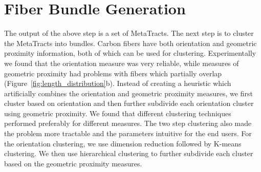 \section {Fiber Bundle Generation}
\label{subsec:fiber-bundles}

The output of the above step is a set of MetaTracts. The next step is to cluster the MetaTracts into bundles. 
Carbon fibers have both orientation and geometric proximity information, both of which can be used for clustering. Experimentally we found that the orientation measure was very reliable, while measures of geometric proximity had problems with fibers which partially overlap (Figure~\ref{fig:length_distribution}b).  
Instead of creating a heuristic which artificially combines the orientation and geometric proximity measures, we first cluster based on orientation and then further subdivide each orientation cluster using geometric proximity.
We found that different clustering techniques performed preferably for different measures.  The two step clustering also made the problem more tractable and  the parameters intuitive for the end users. For the orientation clustering, we use dimension reduction followed by K-means clustering. We then use hierarchical clustering to further subdivide each cluster based on the geometric proximity measures. 



